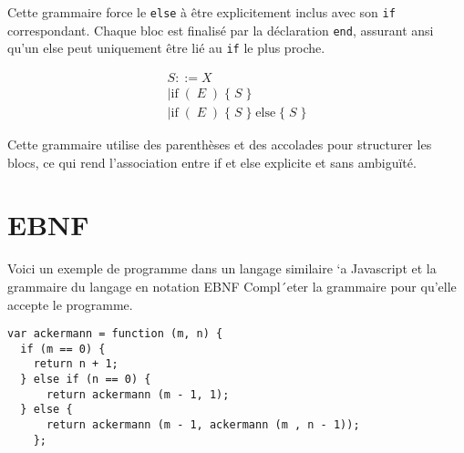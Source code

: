 \documentclass{report}
\begin{document}
\begin{multicols*}{3}
Cette grammaire force le \texttt{else} à être explicitement inclus avec son \texttt{if} 
correspondant. Chaque bloc est finalisé par la déclaration \texttt{end}, assurant ansi qu'un 
else peut uniquement être lié au \texttt{if}   le plus proche.

\begin{align*}
 S ::= X \\
    \mid \text{if} \; ( \; E \; ) \; \{ \; S \; \} \\
    \mid \text{if} \; ( \; E \; ) \; \{ \; S \; \} \; \text{else} \; \{ \; S \; \}
\end{align*}

Cette grammaire utilise des parenthèses et des accolades pour structurer les blocs, ce qui rend 
l'association entre if et else explicite et sans ambiguïté.

\chapter{EBNF}

\begin{Exercice}{}{}
 Voici un exemple de programme dans un langage similaire `a Javascript et 
 la grammaire du langage en notation EBNF 
 Compl´eter la grammaire pour qu’elle accepte le programme. 
\end{Exercice}

\begin{adjustbox}{width=\linewidth}
  \begin{lstlisting}
var ackermann = function (m, n) {
  if (m == 0) {
    return n + 1;
  } else if (n == 0) {
      return ackermann (m - 1, 1);
  } else {
      return ackermann (m - 1, ackermann (m , n - 1));
    };  
  \end{lstlisting}
\end{adjustbox}
\end{multicols*}

\end{document}
